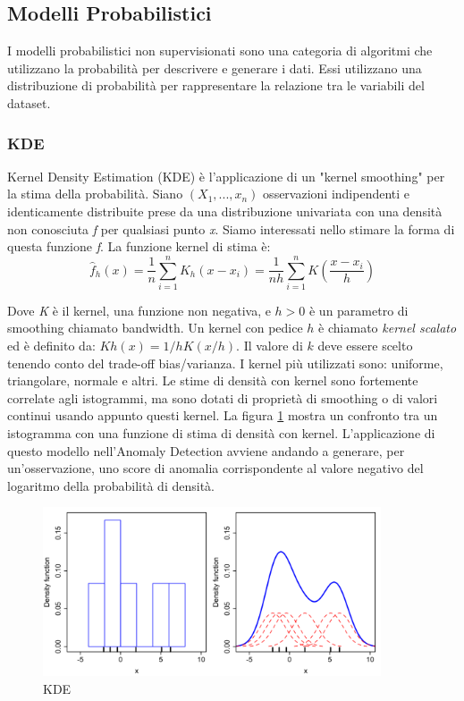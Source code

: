 \subsection{Modelli Probabilistici}
I modelli probabilistici non supervisionati sono una categoria di algoritmi che utilizzano la probabilità per descrivere e generare i dati. Essi utilizzano una distribuzione di probabilità per rappresentare la relazione tra le variabili del dataset.
\subsubsection{KDE}
Kernel Density Estimation (KDE) è l'applicazione di un "kernel smoothing" per la stima della probabilità. 
Siano $(X_1,...,x_n)$ osservazioni indipendenti e identicamente distribuite prese da una distribuzione univariata con una densità non conosciuta \textit{f} per qualsiasi punto \textit{x}. Siamo interessati nello stimare la forma di questa funzione \textit{f}. La funzione kernel di stima è:
\[\widehat{f}_h(x)=\frac{1}{n} \sum_{i=1}^n K_h\left(x-x_i\right)=\frac{1}{n h} \sum_{i=1}^n K\left(\frac{x-x_i}{h}\right)\]

Dove \textit{K} è il kernel, una funzione non negativa, e $h>0$ è un parametro di smoothing chiamato bandwidth. Un kernel con pedice $h$ è chiamato \textit{kernel scalato} ed è definito da: $Kh(x) = 1/h K(x/h)$. 
Il valore di $k$ deve essere scelto tenendo conto del trade-off bias/varianza.
I kernel più utilizzati sono: uniforme, triangolare, normale e altri.
Le stime di densità con kernel sono fortemente correlate agli istogrammi, ma sono dotati di proprietà di smoothing o di valori continui usando appunto questi kernel.
La figura \ref{kde_model} mostra un confronto tra un istogramma con una funzione di stima di densità con kernel.
L'applicazione di questo modello nell'Anomaly Detection avviene andando a generare, per un'osservazione, uno score di anomalia corrispondente al valore negativo del logaritmo della probabilità di densità.

\begin{figure}[t]
	\centering
	\includegraphics[width=10cm, scale=1]{images/kde_model}
	\caption{KDE}
	\label{kde_model}
\end{figure}


